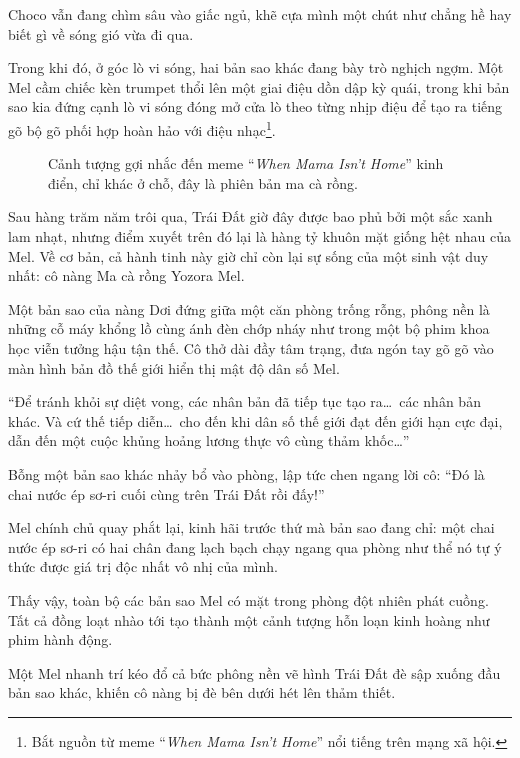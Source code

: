 \documentclass[../main.tex]{subfiles}
\begin{document}
Choco vẫn đang chìm sâu vào giấc ngủ, khẽ cựa mình một chút như chẳng hề hay biết gì về sóng gió vừa đi qua.

Trong khi đó, ở góc lò vi sóng, hai bản sao khác đang bày trò nghịch ngợm. Một Mel cầm chiếc kèn trumpet thổi lên một giai điệu dồn dập kỳ quái, trong khi bản sao kia đứng cạnh lò vi sóng đóng mở cửa lò theo từng nhịp điệu để tạo ra tiếng gõ bộ gõ phối hợp hoàn hảo với điệu nhạc\footnote{Bắt nguồn từ meme ``\textit{When Mama Isn't Home}'' nổi tiếng trên mạng xã hội.}.

\begin{figure}[H]
  \centering
  \caption{Cảnh tượng gợi nhắc đến meme ``\textit{When Mama Isn't Home}'' kinh điển, chỉ khác ở chỗ, đây là phiên bản ma cà rồng.}
\end{figure}

\ct

Sau hàng trăm năm trôi qua, Trái Đất giờ đây được bao phủ bởi một sắc xanh lam nhạt, nhưng điểm xuyết trên đó lại là hàng tỷ khuôn mặt giống hệt nhau của Mel. Về cơ bản, cả hành tinh này giờ chỉ còn lại sự sống của một sinh vật duy nhất: cô nàng Ma cà rồng Yozora Mel.

Một bản sao của nàng Dơi đứng giữa một căn phòng trống rỗng, phông nền là những cỗ máy khổng lồ cùng ánh đèn chớp nháy như trong một bộ phim khoa học viễn tưởng hậu tận thế. Cô thở dài đầy tâm trạng, đưa ngón tay gõ gõ vào màn hình bản đồ thế giới hiển thị mật độ dân số Mel.

``Để tránh khỏi sự diệt vong, các nhân bản đã tiếp tục tạo ra\dots\ các nhân bản khác. Và cứ thế tiếp diễn\dots\ cho đến khi dân số thế giới đạt đến giới hạn cực đại, dẫn đến một cuộc khủng hoảng lương thực vô cùng thảm khốc\dots''

Bỗng một bản sao khác nhảy bổ vào phòng, lập tức chen ngang lời cô: ``Đó là chai nước ép sơ-ri cuối cùng trên Trái Đất rồi đấy!''

Mel chính chủ quay phắt lại, kinh hãi trước thứ mà bản sao đang chỉ: một chai nước ép sơ-ri có hai chân đang lạch bạch chạy ngang qua phòng như thể nó tự ý thức được giá trị độc nhất vô nhị của mình.

Thấy vậy, toàn bộ các bản sao Mel có mặt trong phòng đột nhiên phát cuồng. Tất cả đồng loạt nhào tới tạo thành một cảnh tượng hỗn loạn kinh hoàng như phim hành động.


Một Mel nhanh trí kéo đổ cả bức phông nền vẽ hình Trái Đất đè sập xuống đầu bản sao khác, khiến cô nàng bị đè bên dưới hét lên thảm thiết.
\end{document}
